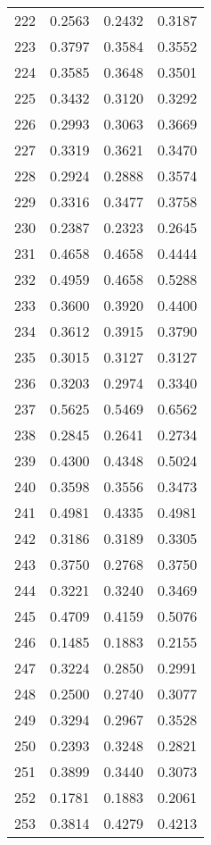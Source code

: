 \begin{table}[ht]
\begin{tabular}{|c|c|c|c|}
222  &  0.2563   &  0.2432   &  0.3187 \\ 
223  &  0.3797   &  0.3584   &  0.3552 \\ 
224  &  0.3585   &  0.3648   &  0.3501 \\ 
225  &  0.3432   &  0.3120   &  0.3292 \\ 
226  &  0.2993   &  0.3063   &  0.3669 \\ 
227  &  0.3319   &  0.3621   &  0.3470 \\ 
228  &  0.2924   &  0.2888   &  0.3574 \\ 
229  &  0.3316   &  0.3477   &  0.3758 \\ 
230  &  0.2387   &  0.2323   &  0.2645 \\ 
231  &  0.4658   &  0.4658   &  0.4444 \\ 
232  &  0.4959   &  0.4658   &  0.5288 \\ 
233  &  0.3600   &  0.3920   &  0.4400 \\ 
234  &  0.3612   &  0.3915   &  0.3790 \\ 
235  &  0.3015   &  0.3127   &  0.3127 \\ 
236  &  0.3203   &  0.2974   &  0.3340 \\ 
237  &  0.5625   &  0.5469   &  0.6562 \\ 
238  &  0.2845   &  0.2641   &  0.2734 \\ 
239  &  0.4300   &  0.4348   &  0.5024 \\ 
240  &  0.3598   &  0.3556   &  0.3473 \\ 
241  &  0.4981   &  0.4335   &  0.4981 \\ 
242  &  0.3186   &  0.3189   &  0.3305 \\ 
243  &  0.3750   &  0.2768   &  0.3750 \\ 
244  &  0.3221   &  0.3240   &  0.3469 \\ 
245  &  0.4709   &  0.4159   &  0.5076 \\ 
246  &  0.1485   &  0.1883   &  0.2155 \\ 
247  &  0.3224   &  0.2850   &  0.2991 \\ 
248  &  0.2500   &  0.2740   &  0.3077 \\ 
249  &  0.3294   &  0.2967   &  0.3528 \\ 
250  &  0.2393   &  0.3248   &  0.2821 \\ 
251  &  0.3899   &  0.3440   &  0.3073 \\ 
252  &  0.1781   &  0.1883   &  0.2061 \\ 
253  &  0.3814   &  0.4279   &  0.4213 \\ 

\end{tabular}
\end{table}
